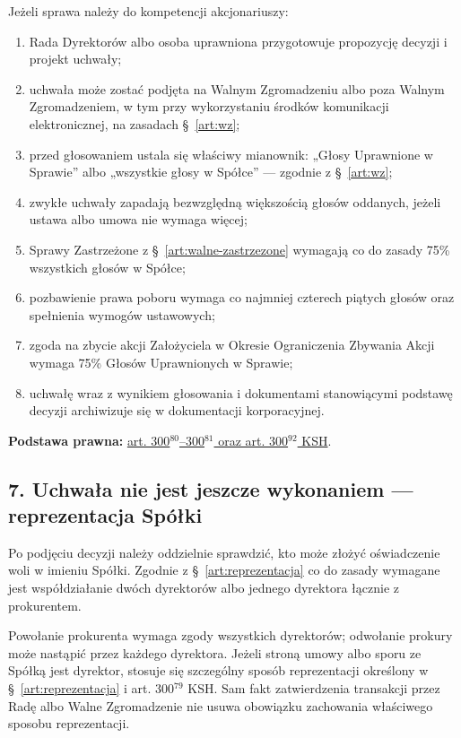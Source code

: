 \documentclass[12pt,a4paper]{report}
\begin{document}
Jeżeli sprawa należy do kompetencji akcjonariuszy:
\begin{enumerate}
  \item Rada Dyrektorów albo osoba uprawniona przygotowuje propozycję decyzji i projekt uchwały;
  \item uchwała może zostać podjęta na Walnym Zgromadzeniu albo poza Walnym Zgromadzeniem, w tym przy wykorzystaniu środków komunikacji elektronicznej, na zasadach §~\ref{art:wz};
  \item przed głosowaniem ustala się właściwy mianownik: „Głosy Uprawnione w Sprawie” albo „wszystkie głosy w Spółce” — zgodnie z §~\ref{art:wz};
  \item zwykłe uchwały zapadają bezwzględną większością głosów oddanych, jeżeli ustawa albo umowa nie wymaga więcej;
  \item Sprawy Zastrzeżone z §~\ref{art:walne-zastrzezone} wymagają co do zasady 75\% wszystkich głosów w Spółce;
  \item pozbawienie prawa poboru wymaga co najmniej czterech piątych głosów oraz spełnienia wymogów ustawowych;
  \item zgoda na zbycie akcji Założyciela w Okresie Ograniczenia Zbywania Akcji wymaga 75\% Głosów Uprawnionych w Sprawie;
  \item uchwałę wraz z wynikiem głosowania i dokumentami stanowiącymi podstawę decyzji archiwizuje się w dokumentacji korporacyjnej.
\end{enumerate}

\textbf{Podstawa prawna:} \href{https://eli.gov.pl/api/acts/DU/2024/18/text.html}{art. 300$^{80}$--300$^{81}$ oraz art. 300$^{92}$ KSH}.

\subsection*{7. Uchwała nie jest jeszcze wykonaniem — reprezentacja Spółki}

Po podjęciu decyzji należy oddzielnie sprawdzić, kto może złożyć oświadczenie woli w imieniu Spółki. Zgodnie z §~\ref{art:reprezentacja} co do zasady wymagane jest współdziałanie dwóch dyrektorów albo jednego dyrektora łącznie z prokurentem.

Powołanie prokurenta wymaga zgody wszystkich dyrektorów; odwołanie prokury może nastąpić przez każdego dyrektora. Jeżeli stroną umowy albo sporu ze Spółką jest dyrektor, stosuje się szczególny sposób reprezentacji określony w §~\ref{art:reprezentacja} i art. 300$^{79}$ KSH. Sam fakt zatwierdzenia transakcji przez Radę albo Walne Zgromadzenie nie usuwa obowiązku zachowania właściwego sposobu reprezentacji.
\end{document}
